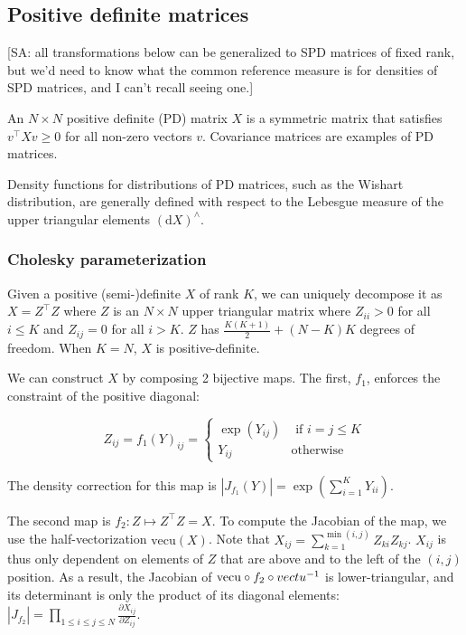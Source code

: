 \documentclass[11pt]{article}
\newcommand{\abs}[1]{\left| #1 \right|}
\newcommand{\absdet}[1]{\abs{#1}}
\newcommand{\dv}[1]{\mathrm{d}{#1}}
\newcommand{\vectu}{\mathrm{vecu}}
\begin{document}
\subsection{Positive definite matrices}

[SA: all transformations below can be generalized to SPD matrices of fixed rank, but we'd need to know what the common reference measure is for densities of SPD matrices, and I can't recall seeing one.]

An $N \times N$ positive definite (PD) matrix $X$ is a symmetric matrix that satisfies $v^\top X v \ge 0$ for all non-zero vectors $v$.
Covariance matrices are examples of PD matrices.

Density functions for distributions of PD matrices, such as the Wishart distribution, are generally defined with respect to the Lebesgue measure of the upper triangular elements $(\dv{X})^\wedge$.

\subsubsection{Cholesky parameterization}

Given a positive (semi-)definite $X$ of rank $K$, we can uniquely decompose it as $X = Z^\top Z$ where $Z$ is an $N \times N$ upper triangular matrix where $Z_{ii} > 0$ for all $i \le K$ and $Z_{ij} = 0$ for all $i > K$.
$Z$ has $\frac{K(K+1)}{2} + (N - K)K$ degrees of freedom.
When $K=N$, $X$ is positive-definite.

We can construct $X$ by composing 2 bijective maps.
The first, $f_1$, enforces the constraint of the positive diagonal:

\[Z_{ij} = f_1(Y)_{ij} = \begin{cases} \exp(Y_{ij}) & \text{ if } i = j \le K \\ Y_{ij} & \text{otherwise} \end{cases}\]

The density correction for this map is $\absdet{J_{f_1}(Y)} = \exp(\sum_{i=1}^K Y_{ii})$.

The second map is $f_2: Z \mapsto Z^\top Z = X$.
To compute the Jacobian of the map, we use the half-vectorization $\vectu(X)$.
Note that $X_{ij} = \sum_{k=1}^{\min(i, j)} Z_{ki} Z_{kj}$.
$X_{ij}$ is thus only dependent on elements of $Z$ that are above and to the left of the $(i, j)$ position.
As a result, the Jacobian of $\vectu \circ f_2 \circ \\vectu^{-1}$ is lower-triangular, and its determinant is only the product of its diagonal elements: $\absdet{J_{f_2}} = \prod_{1 \le i \le j \le N} \frac{\partial X_{ij}}{\partial Z_{ij}}$.
\end{document}
